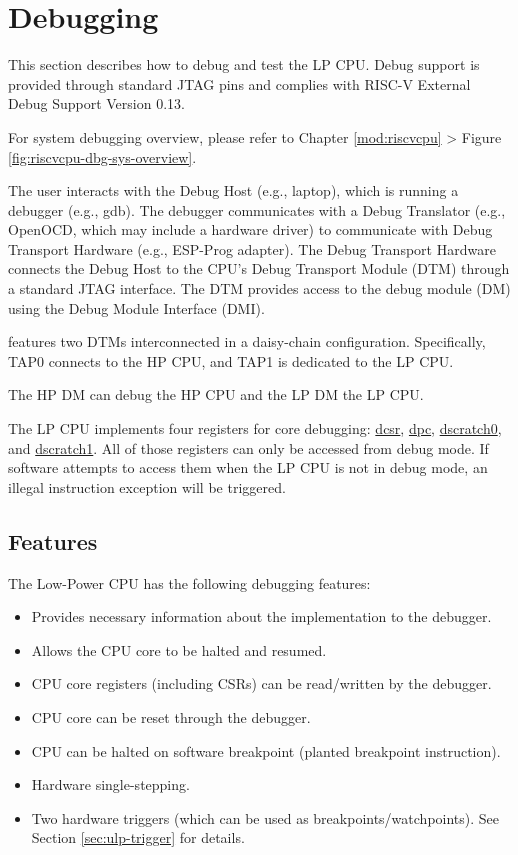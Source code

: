 \documentclass[main\_\_EN.tex]{subfiles}
\begin{document}
\section{Debugging}

This section describes how to debug and test the LP CPU. Debug support is provided through standard JTAG pins and complies with RISC-V External Debug Support Version 0.13.

For \chipname{} system debugging overview, please refer to Chapter \ref{mod:riscvcpu} \textit{} > Figure \ref{fig:riscvcpu-dbg-sys-overview}.

The user interacts with the Debug Host (e.g., laptop), which is running a debugger (e.g., gdb). The debugger communicates with a Debug Translator (e.g., OpenOCD, which may include a hardware driver) to communicate with Debug Transport Hardware (e.g., ESP-Prog adapter). The Debug Transport Hardware connects the Debug Host to the CPU's Debug Transport Module (DTM) through a standard JTAG interface. The DTM provides access to the debug module (DM) using the Debug Module Interface (DMI).

\chipname{} features two DTMs interconnected in a daisy-chain configuration. Specifically, TAP0 connects to the HP CPU, and TAP1 is dedicated to the LP CPU.

The HP DM can debug the HP CPU and the LP DM the LP CPU.


The LP CPU implements four registers for core debugging: \hyperref[regdesc:LPDCSR]{dcsr}, \hyperref[regdesc:LPDPC]{dpc}, \hyperref[regdesc:LPDSCRATCH0]{dscratch0}, and \hyperref[regdesc:LPDSCRATCH1]{dscratch1}. All of those registers can only be accessed from debug mode. If software attempts to access them when the LP CPU is not in debug mode, an illegal instruction exception will be triggered.

\subsection{Features}
The Low-Power CPU has the following debugging features:
\begin{itemize}
    \item {Provides necessary information about the implementation to the debugger.}
    \item {Allows the CPU core to be halted and resumed.}
    \item {CPU core registers (including CSRs) can be read/written by the debugger.}
    \item {CPU core can be reset through the debugger.}
    \item {CPU can be halted on software breakpoint (planted breakpoint instruction).}
    \item {Hardware single-stepping.}
    \item {Two hardware triggers (which can be used as breakpoints/watchpoints). See Section \ref{sec:ulp-trigger} for details.}
\end{itemize}
\end{document}
